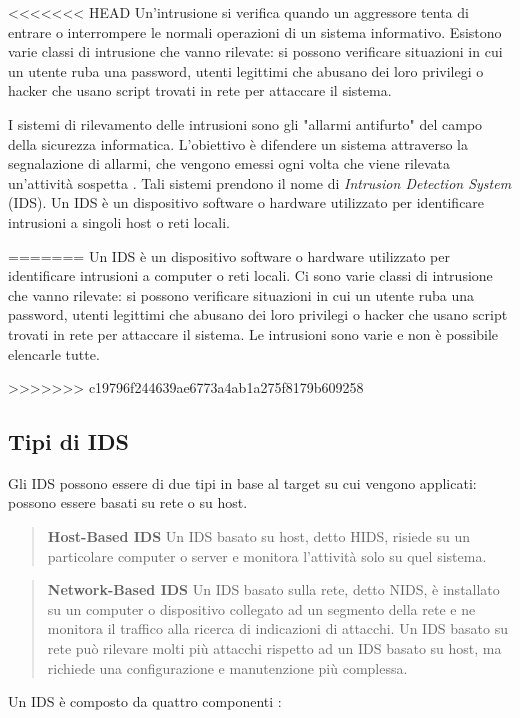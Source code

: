 \documentclass[../main.tex]{subfiles}
\begin{document}
<<<<<<< HEAD
Un'intrusione si verifica quando un aggressore tenta di entrare o interrompere le normali operazioni di un sistema informativo\cite{idsbook}. Esistono varie classi di intrusione che vanno rilevate: si possono verificare situazioni in cui un utente ruba una password, utenti legittimi che abusano dei loro privilegi o hacker che usano script trovati in rete per attaccare il sistema.

I sistemi di rilevamento delle intrusioni sono gli "allarmi antifurto" del campo della sicurezza informatica. L'obiettivo è difendere un sistema attraverso la segnalazione di allarmi, che vengono emessi ogni volta che viene rilevata un'attività sospetta \cite{IDS}. Tali sistemi prendono il nome di \textit{Intrusion Detection System} (IDS). Un IDS è un dispositivo software o hardware utilizzato per identificare intrusioni a singoli host o reti locali.

=======
Un IDS è un dispositivo software o hardware utilizzato per identificare intrusioni a computer o reti locali.
Ci sono varie classi di intrusione che vanno rilevate: si possono verificare situazioni in cui un utente ruba una password, utenti legittimi che abusano dei loro privilegi o hacker che usano script trovati in rete per attaccare il sistema. Le intrusioni sono varie e non è possibile elencarle tutte.

>>>>>>> c19796f244639ae6773a4ab1a275f8179b609258
\subsection{Tipi di IDS}
Gli IDS possono essere di due tipi in base al target su cui vengono applicati: possono essere basati su rete o su host.
\begin{verse}
				\textbf{Host-Based IDS} Un IDS basato su host, detto HIDS, risiede su un particolare computer o server e monitora l'attività solo su quel sistema.
\end{verse}

\begin{verse}
				\textbf{Network-Based IDS} Un IDS basato sulla rete, detto NIDS, è installato su un computer o dispositivo collegato ad un segmento della rete e ne monitora il traffico alla ricerca di indicazioni di attacchi. Un IDS basato su rete può rilevare molti più attacchi rispetto ad un IDS basato su host, ma richiede una configurazione e manutenzione più complessa.
\end{verse}

Un IDS è composto da quattro componenti \cite{idsbook}:
\end{document}
